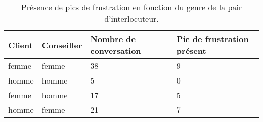 \begin{table}[]
\centering
\begin{tabular}{|l l|l|l|}
 \hline
 Client	&Conseiller	&Nombre de conversation	&Pic de frustration présent \\
 \hline
femme	&femme	&38	&9	\\
homme	&homme	&5	&0	\\
femme	&homme	&17	&5	\\
homme	&femme	&21	&7	\\
 \hline
\end{tabular}
\caption{Présence de pics de frustration en fonction du genre de la pair d'interlocuteur.}
\label{tab:genre}
\end{table}
